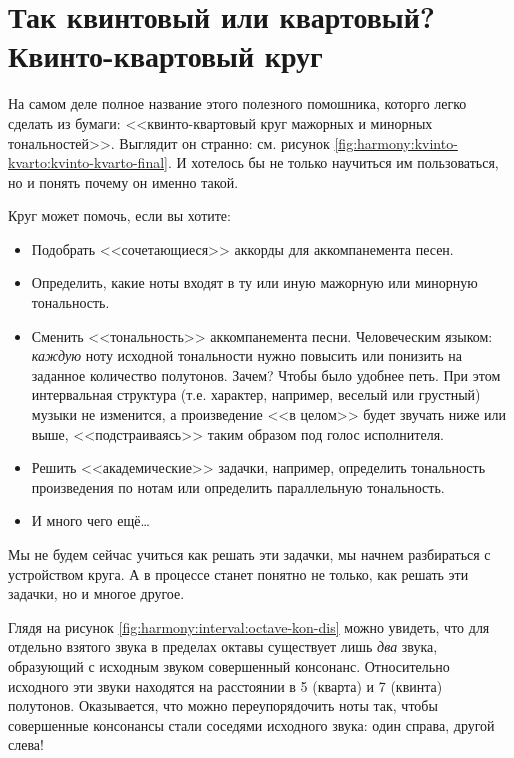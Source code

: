 \section{Так квинтовый или квартовый? Квинто-квартовый круг}
\label{ch:harmony:kvinto-kvarto-round}

На самом деле полное название этого полезного помошника, которго легко сделать из бумаги: <<квинто-квартовый круг мажорных и минорных тональностей>>. Выглядит он странно: см. рисунок \ref{fig:harmony:kvinto-kvarto:kvinto-kvarto-final}. И хотелось бы не только научиться им пользоваться, но и понять почему он именно такой.

Круг может помочь, если вы хотите:
\begin{itemize}
    \item Подобрать <<сочетающиеся>> аккорды для аккомпанемента песен.
    
    \item Определить, какие ноты входят в ту или иную мажорную или минорную тональность.
    
    \item Сменить <<тональность>> аккомпанемента песни. Человеческим языком: \emph{каждую} ноту исходной тональности нужно повысить или понизить на заданное количество полутонов. Зачем? Чтобы было удобнее петь. При этом интервальная структура (т.е. характер, например, веселый или грустный) музыки не изменится, а произведение <<в целом>> будет звучать ниже или выше, <<подстраиваясь>> таким образом под голос исполнителя.    

    \item Решить <<академические>> задачки, например, определить тональность произведения по нотам или определить параллельную тональность.
    
    \item И много чего ещё\ldots
\end{itemize}

Мы не будем сейчас учиться как решать эти задачки, мы начнем разбираться с устройством круга. А в процессе станет понятно не только, как решать эти задачки, но и многое другое.

Глядя на рисунок \ref{fig:harmony:interval:octave-kon-dis} можно увидеть, что для отдельно взятого звука в пределах октавы существует лишь \emph{два} звука, образующий с исходным звуком совершенный консонанс. Относительно исходного эти звуки находятся на расстоянии в 5 (кварта) и 7 (квинта) полутонов. Оказывается, что можно переупорядочить ноты так, чтобы совершенные консонансы стали соседями исходного звука: один справа, другой слева!

